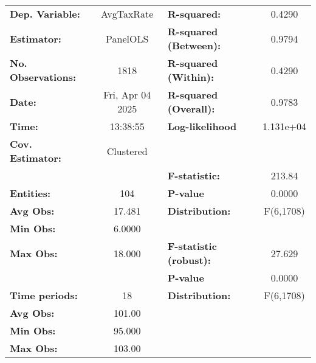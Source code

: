 \begin{center}
\begin{tabular}{lclc}
\toprule
\textbf{Dep. Variable:}              &     AvgTaxRate     & \textbf{  R-squared:         }   &      0.4290      \\
\textbf{Estimator:}                  &      PanelOLS      & \textbf{  R-squared (Between):}  &      0.9794      \\
\textbf{No. Observations:}           &        1818        & \textbf{  R-squared (Within):}   &      0.4290      \\
\textbf{Date:}                       &  Fri, Apr 04 2025  & \textbf{  R-squared (Overall):}  &      0.9783      \\
\textbf{Time:}                       &      13:38:55      & \textbf{  Log-likelihood     }   &    1.131e+04     \\
\textbf{Cov. Estimator:}             &     Clustered      & \textbf{                     }   &                  \\
\textbf{}                            &                    & \textbf{  F-statistic:       }   &      213.84      \\
\textbf{Entities:}                   &        104         & \textbf{  P-value            }   &      0.0000      \\
\textbf{Avg Obs:}                    &       17.481       & \textbf{  Distribution:      }   &    F(6,1708)     \\
\textbf{Min Obs:}                    &       6.0000       & \textbf{                     }   &                  \\
\textbf{Max Obs:}                    &       18.000       & \textbf{  F-statistic (robust):} &      27.629      \\
\textbf{}                            &                    & \textbf{  P-value            }   &      0.0000      \\
\textbf{Time periods:}               &         18         & \textbf{  Distribution:      }   &    F(6,1708)     \\
\textbf{Avg Obs:}                    &       101.00       & \textbf{                     }   &                  \\
\textbf{Min Obs:}                    &       95.000       & \textbf{                     }   &                  \\
\textbf{Max Obs:}                    &       103.00       & \textbf{                     }   &                  \\

\end{tabular}
\end{center}
